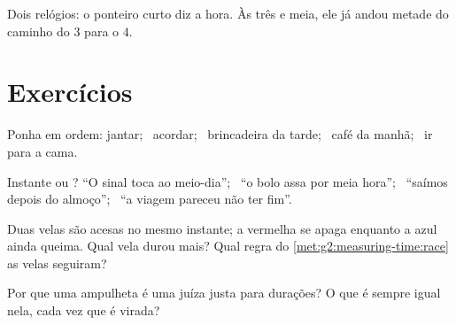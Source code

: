 \begin{omfigure}

{\small Dois relógios: o ponteiro curto diz a hora. Às três e meia,
ele já andou metade do caminho do $3$ para o $4$.}
\end{omfigure}

\section{Exercícios}

\begin{exercise}[$\star$]\label{exo:g2:measuring-time:1}
Ponha em ordem: jantar; \ acordar; \ brincadeira da tarde; \ café da
manhã; \ ir para a cama.
\end{exercise}

\begin{exercise}[$\star$]\label{exo:g2:measuring-time:2}
Instante ou ? ``O sinal toca ao meio-dia''; \ ``o bolo assa
por meia hora''; \ ``saímos depois do almoço''; \ ``a viagem pareceu
não ter fim''.
\end{exercise}

\begin{exercise}[$\star$]\label{exo:g2:measuring-time:3}
Duas velas são acesas no mesmo instante; a vermelha se apaga enquanto
a azul ainda queima. Qual vela durou mais? Qual regra do
\cref{met:g2:measuring-time:race} as velas seguiram?
\end{exercise}

\begin{exercise}[$\star$]\label{exo:g2:measuring-time:4}
Por que uma ampulheta é uma juíza justa para durações? O que é sempre
igual nela, cada vez que é virada?
\end{exercise}

